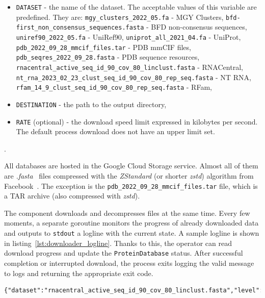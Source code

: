 \begin{itemize}
    \item \texttt{DATASET} - the name of the dataset.
    The acceptable values of this variable are predefined.
    They are:
    \subitem \texttt{mgy\_clusters\_2022\_05.fa} - MGY Clusters,
    \subitem \texttt{bfd-first\_non\_consensus\_sequences.fasta} - BFD non-consensus sequences,
    \subitem \texttt{uniref90\_2022\_05.fa} - UniRef90,
    \subitem \texttt{uniprot\_all\_2021\_04.fa} - UniProt,
    \subitem \texttt{pdb\_2022\_09\_28\_mmcif\_files.tar} - PDB mmCIF files,
    \subitem \texttt{pdb\_seqres\_2022\_09\_28.fasta} - PDB sequence resources,
    \subitem \texttt{rnacentral\_active\_seq\_id\_90\_cov\_80\_linclust.fasta} - RNACentral,
    \subitem \texttt{nt\_rna\_2023\_02\_23\_clust\_seq\_id\_90\_cov\_80\_rep\_seq.fasta} - NT RNA,
    \subitem \texttt{rfam\_14\_9\_clust\_seq\_id\_90\_cov\_80\_rep\_seq.fasta} - RFam,
    \item \texttt{DESTINATION} - the path to the output directory,
    \item \texttt{RATE} (optional) - the download speed limit expressed in kilobytes per second.
    The default process download does not have an upper limit set.
\end{itemize}.

All databases are hosted in the Google Cloud Storage service.
Almost all of them are \textit{.fasta}~\cite{pearson1988fasta} files compressed with the \textit{ZStandard} (or shorter \textit{zstd}) algorithm from Facebook~\cite{zstandard}.
The exception is the \texttt{pdb\_2022\_09\_28\_mmcif\_files.tar} file, which is a TAR archive (also compressed with \textit{zstd}).

The component downloads and decompresses files at the same time.
Every few moments, a separate goroutine monitors the progress of already downloaded data and outputs to \texttt{stdout} a logline with the current state.
A sample logline is shown in listing~\ref{lst:downloader_logline}.
Thanks to this, the operator can read download progress and update the \texttt{ProteinDatabase} status.
After successful completion or interrupted download, the process exits logging the valid message to logs and returning the appropriate exit code.

\begin{lstlisting}[language=txt,caption={Sample logline from downloader},label={lst:downloader_logline}]
{"dataset":"rnacentral_active_seq_id_90_cov_80_linclust.fasta","level":"info","msg":"Download progress","size":7700349721,"time":"2025-05-17T16:53:52+02:00","total":13860314914,"type":"download","unit":"bytes"}
\end{lstlisting}

